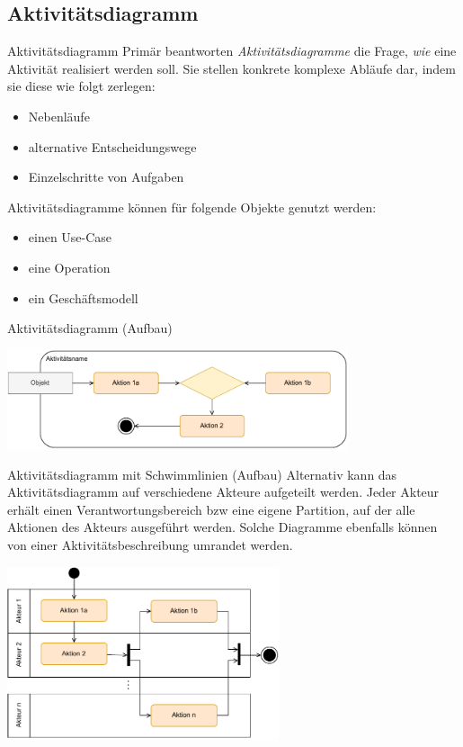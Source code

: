\subsection{Aktivitätsdiagramm}

\begin{defi}{Aktivitätsdiagramm}
    Primär beantworten \emph{Aktivitätsdiagramme} die Frage, \emph{wie} eine Aktivität realisiert werden soll.
    Sie stellen konkrete komplexe Abläufe dar, indem sie diese wie folgt zerlegen:
    \begin{itemize}
        \item Nebenläufe
        \item alternative Entscheidungswege
        \item Einzelschritte von Aufgaben
    \end{itemize}

    Aktivitätsdiagramme können für folgende Objekte genutzt werden:
    \begin{itemize}
        \item einen Use-Case
        \item eine Operation
        \item ein Geschäftsmodell
    \end{itemize}
\end{defi}

\begin{diag}{Aktivitätsdiagramm (Aufbau)}
    \begin{center}
        \includegraphics[width=0.75\textwidth]{includes/figures/defi_diagrams_activity_intro.pdf}
    \end{center}
\end{diag}

\begin{diag}{Aktivitätsdiagramm mit Schwimmlinien (Aufbau)}
    Alternativ kann das Aktivitätsdiagramm auf verschiedene Akteure aufgeteilt werden.
    Jeder Akteur erhält einen Verantwortungsbereich bzw eine eigene Partition, auf der alle Aktionen des Akteurs ausgeführt werden.
    Solche Diagramme ebenfalls können von einer Aktivitätsbeschreibung umrandet werden.
    \begin{center}
        \includegraphics[width=0.6\textwidth]{includes/figures/defi_diagrams_activity_partitions.pdf}
    \end{center}
\end{diag}

